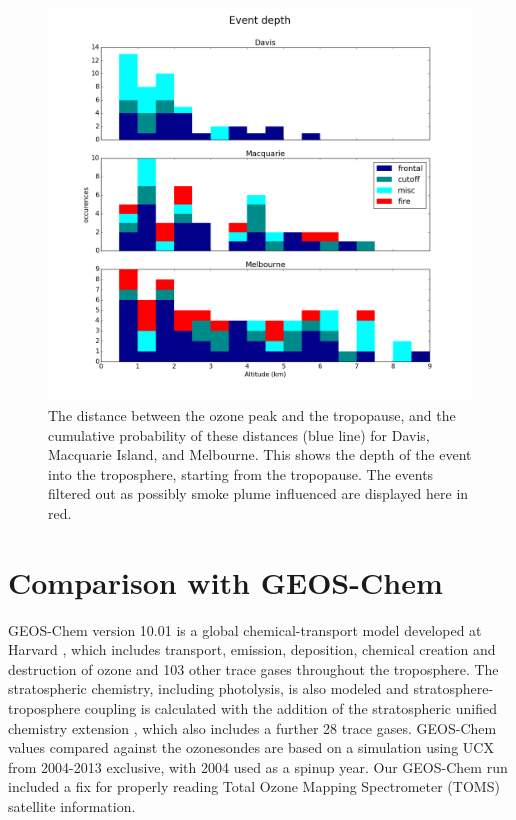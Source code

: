 \documentclass{article}
\begin{document}
  \begin{figure}[!htbp]
    \begin{center}
    \includegraphics[width=0.99\columnwidth]{figures/summary_depth.png}
    \caption{The distance between the ozone peak and the tropopause, and the cumulative probability of these distances (blue line) for Davis, Macquarie Island, and Melbourne.
    This shows the depth of the event into the troposphere, starting from the tropopause.
    The events filtered out as possibly smoke plume influenced are displayed here in red.}
    \label{fig:SummaryTPDepths}
    \end{center}
  \end{figure}

\section{Comparison with GEOS-Chem}
  GEOS-Chem version 10.01 is a global chemical-transport model developed at Harvard \citep{Bey2001}, which includes transport, emission, deposition, chemical creation and destruction of ozone and 103 other trace gases throughout the troposphere.
  The stratospheric chemistry, including photolysis, is also modeled and stratosphere-troposphere coupling is calculated with the addition of the stratospheric unified chemistry extension \citep{Eastham2014}, which also includes a further 28 trace gases.
  GEOS-Chem values compared against the ozonesondes are based on a simulation using UCX from 2004-2013 exclusive, with 2004 used as a spinup year.
  Our GEOS-Chem run included a fix for properly reading Total Ozone Mapping Spectrometer (TOMS) satellite information.
  
\end{document}
